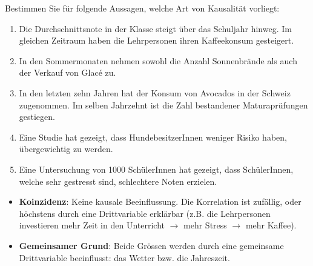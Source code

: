 \begin{myexercise}
	Bestimmen Sie für folgende Aussagen, welche Art von Kausalität vorliegt:

	\begin{enumerate}
		\item Die Durchschnittsnote in der Klasse steigt über das Schuljahr hinweg. Im gleichen Zeitraum haben die Lehrpersonen ihren Kaffeekonsum gesteigert.
		\item In den Sommermonaten nehmen sowohl die Anzahl Sonnenbrände als auch der Verkauf von Glacé zu.
		\item In den letzten zehn Jahren hat der Konsum von Avocados in der Schweiz zugenommen. Im selben Jahrzehnt ist die Zahl bestandener Maturaprüfungen gestiegen.
		\item Eine Studie hat gezeigt, dass HundebesitzerInnen weniger Risiko haben, übergewichtig zu werden.
		\item Eine Untersuchung von 1000 SchülerInnen hat gezeigt, dass SchülerInnen, welche sehr gestresst sind, schlechtere Noten erzielen.
	\end{enumerate}

	\begin{myanswer}
		\begin{itemize}
			\item \textbf{Koinzidenz}: Keine kausale Beeinflussung. Die Korrelation ist zufällig, oder höchstens durch eine Drittvariable erklärbar (z.B. die Lehrpersonen investieren mehr Zeit in den Unterricht $\rightarrow$ mehr Stress $\rightarrow$ mehr Kaffee).
			      \begin{center}
			      \end{center}

			\item \textbf{Gemeinsamer Grund}: Beide Grössen werden durch eine gemeinsame Drittvariable beeinflusst: das Wetter bzw. die Jahreszeit.
			      \begin{center}
			      \end{center}


\end{itemize}
\end{myanswer}
\end{myexercise}
